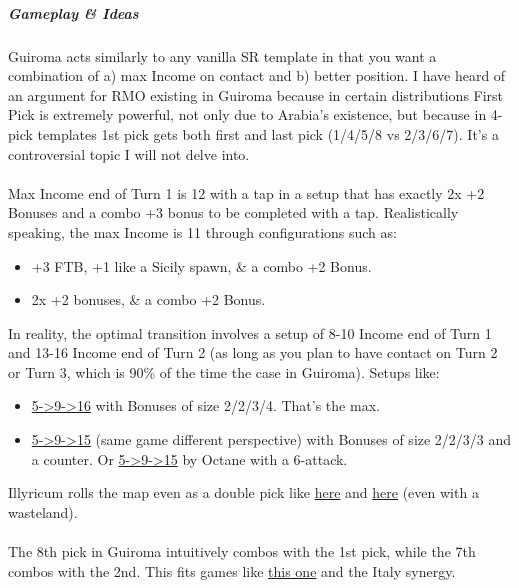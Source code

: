 \subparagraph{Gameplay \& Ideas}

Guiroma acts similarly to any vanilla SR template in that you want a combination of a) max Income on contact and b) better position. I have heard of an argument for RMO existing in Guiroma because in certain distributions First Pick is extremely powerful, not only due to Arabia's existence, but because in 4-pick templates 1st pick gets both first and last pick (1/4/5/8 vs 2/3/6/7). It's a controversial topic I will not delve into.
\\
\\
Max Income end of Turn 1 is 12 with a tap in a setup that has exactly 2x +2 Bonuses and a combo +3 bonus to be completed with a tap. Realistically speaking, the max Income is 11 through configurations such as:
\begin{itemize}
    \item +3 FTB, +1 like a Sicily spawn, \& a combo +2 Bonus.
    \item 2x +2 bonuses, \& a combo +2 Bonus.
\end{itemize}

In reality, the optimal transition involves a setup of 8-10 Income end of Turn 1 and 13-16 Income end of Turn 2 (as long as you plan to have contact on Turn 2 or Turn 3, which is 90\% of the time the case in Guiroma). Setups like:
\begin{itemize}
    \item \href{https://www.warzone.com/MultiPlayer?GameID=40882156}{5->9->16} with Bonuses of size 2/2/3/4. That's the max.
    \item \href{https://www.warzone.com/MultiPlayer?GameID=40882156}{5->9->15} (same game different perspective) with Bonuses of size 2/2/3/3 and a counter. Or \href{https://www.warzone.com/MultiPlayer?GameID=40742256}{5->9->15} by Octane with a 6-attack.
\end{itemize}

Illyricum rolls the map even as a double pick like \href{https://www.warzone.com/MultiPlayer?GameID=36808169}{here} and \href{https://www.warzone.com/MultiPlayer?GameID=26520244}{here} (even with a wasteland).
\\
\\
The 8th pick in Guiroma intuitively combos with the 1st pick, while the 7th combos with the 2nd. This fits games like \href{https://www.warzone.com/MultiPlayer?GameID=40568482}{this one} and the Italy synergy.
